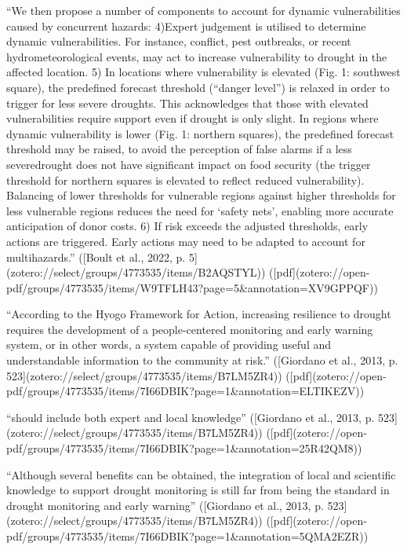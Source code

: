{“We then propose a number of components to account for dynamic vulnerabilities caused by concurrent hazards:
4)Expert judgement is utilised to determine dynamic vulnerabilities. For instance, conflict, pest outbreaks, or recent hydrometeorological events, may act to increase vulnerability to drought in the affected location.
5) In locations where vulnerability is elevated (Fig. 1: southwest square), the predefined forecast threshold (“danger level”) is relaxed in order to trigger for less severe droughts. This acknowledges that those with elevated vulnerabilities require support even if drought is only slight. In regions where dynamic vulnerability is lower (Fig. 1: northern squares), the predefined forecast threshold may be raised, to avoid the perception of false alarms if a less severedrought does not have significant impact on food security (the trigger threshold for northern squares is elevated to reflect reduced vulnerability). Balancing of lower thresholds for vulnerable regions against higher thresholds for less vulnerable regions reduces the need for ‘safety nets’, enabling more accurate anticipation of donor costs.
6) If risk exceeds the adjusted thresholds, early actions are triggered. Early actions may need to be adapted to account for multihazards.” ([Boult et al., 2022, p. 5](zotero://select/groups/4773535/items/B2AQSTYL)) ([pdf](zotero://open-pdf/groups/4773535/items/W9TFLH43?page=5&annotation=XV9GPPQF))


“According to the Hyogo Framework for Action, increasing resilience to drought requires the development of a people-centered monitoring and early warning system, or in other words, a system capable of providing useful and understandable information to the community at risk.” ([Giordano et al., 2013, p. 523](zotero://select/groups/4773535/items/B7LM5ZR4)) ([pdf](zotero://open-pdf/groups/4773535/items/7I66DBIK?page=1&annotation=ELTIKEZV))

“should include both expert and local knowledge” ([Giordano et al., 2013, p. 523](zotero://select/groups/4773535/items/B7LM5ZR4)) ([pdf](zotero://open-pdf/groups/4773535/items/7I66DBIK?page=1&annotation=25R42QM8))

“Although several benefits can be obtained, the integration of local and scientific knowledge to support drought monitoring is still far from being the standard in drought monitoring and early warning” ([Giordano et al., 2013, p. 523](zotero://select/groups/4773535/items/B7LM5ZR4)) ([pdf](zotero://open-pdf/groups/4773535/items/7I66DBIK?page=1&annotation=5QMA2EZR))

}

